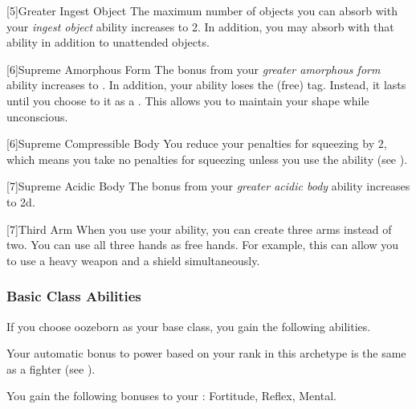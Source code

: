             [5]{Greater Ingest Object} The maximum number of objects you can absorb with your \textit{ingest object} ability increases to 2.
            In addition, you may absorb  with that ability in addition to unattended objects.

            [6]{Supreme Amorphous Form} The bonus from your \textit{greater amorphous form} ability increases to .
            In addition, your  ability loses the  (free) tag.
            Instead, it lasts until you choose to  it as a .
            This allows you to maintain your shape while unconscious.

            [6]{Supreme Compressible Body} You reduce your penalties for squeezing by 2, which means you take no penalties for squeezing unless you use the  ability (see ).

            [7]{Supreme Acidic Body} The bonus from your \textit{greater acidic body} ability increases to \plus2d.

            [7]{Third Arm} When you use your  ability, you can create three arms instead of two.
            You can use all three hands as free hands.
            For example, this can allow you to use a heavy weapon and a shield simultaneously.

        \subsubsection{Basic Class Abilities}
            If you choose oozeborn as your base class, you gain the following abilities.

             Your automatic bonus to power based on your rank in this archetype is the same as a fighter (see ).

            You gain the following bonuses to your :  Fortitude,  Reflex,  Mental.

